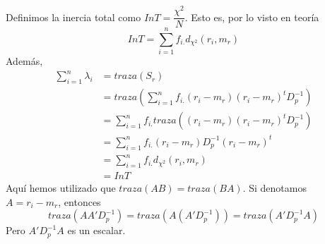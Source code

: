 \documentclass[twoside]{article}
\begin{document}
\begin{enumerate}
Definimos la inercia total como $InT = \dfrac{\chi^2}{N}$. Esto es, por lo visto en teoría
$$
InT = \sum_{i=1}^n f_{i.}d_{\chi^2}(r_i,m_r)
$$
Además,
\begin{align*}
\sum_{i=1}^n \lambda_i & = traza(S_r)\\
&=traza\left(\sum_{i=1}^n f_{i.} (r_i - m_r) (r_i - m_r)^t D_p^{-1} \right)\\
&= \sum_{i=1}^n f_{i.} traza((r_i - m_r) (r_i - m_r)^t D_p^{-1})\\
& = \sum_{i=1}^n f_{i.}(r_i - m_r) D_p^{-1} (r_i - m_r)^t \\
&= \sum_{i=1}^n f_{i.}d_{\chi^2}(r_i,m_r)\\
& = InT
\end{align*}
Aquí hemos utilizado que $traza(AB)=traza(BA)$. Si denotamos $A=r_i - m_r$, entonces
$$
traza(AA'D_p^{-1}) = traza(A(A'D_p^{-1})) = traza(A'D_p^{-1}A)
$$
Pero $A'D_p^{-1}A$ es un escalar.
\end{enumerate}
\newpage
\end{document}
